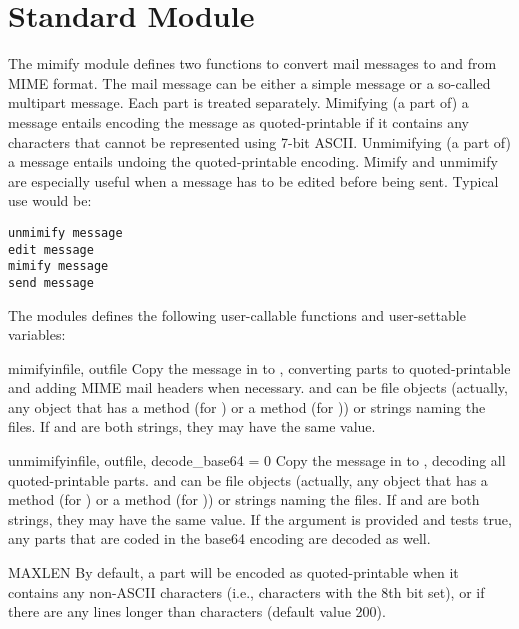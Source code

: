 \section{Standard Module }
\renewcommand{\indexsubitem}{(in module mimify)}

The mimify module defines two functions to convert mail messages to
and from MIME format.  The mail message can be either a simple message
or a so-called multipart message.  Each part is treated separately.
Mimifying (a part of) a message entails encoding the message as
quoted-printable if it contains any characters that cannot be
represented using 7-bit ASCII.  Unmimifying (a part of) a message
entails undoing the quoted-printable encoding.  Mimify and unmimify
are especially useful when a message has to be edited before being
sent.  Typical use would be:

\begin{verbatim}
unmimify message
edit message
mimify message
send message
\end{verbatim}

The modules defines the following user-callable functions and
user-settable variables:

\begin{funcdesc}{mimify}{infile, outfile}
Copy the message in  to , converting parts to
quoted-printable and adding MIME mail headers when necessary.
 and  can be file objects (actually, any
object that has a  method (for ) or a
 method (for )) or strings naming the files.
If  and  are both strings, they may have the
same value.
\end{funcdesc}

\begin{funcdesc}{unmimify}{infile, outfile, decode_base64 = 0} 
Copy the message in  to , decoding all
quoted-printable parts.   and  can be file
objects (actually, any object that has a  method (for
) or a  method (for )) or strings
naming the files.  If  and  are both strings,
they may have the same value.
If the  argument is provided and tests true, any
parts that are coded in the base64 encoding are decoded as well.
\end{funcdesc}

\begin{datadesc}{MAXLEN}
By default, a part will be encoded as quoted-printable when it
contains any non-ASCII characters (i.e., characters with the 8th bit
set), or if there are any lines longer than  characters
(default value 200).  
\end{datadesc}

